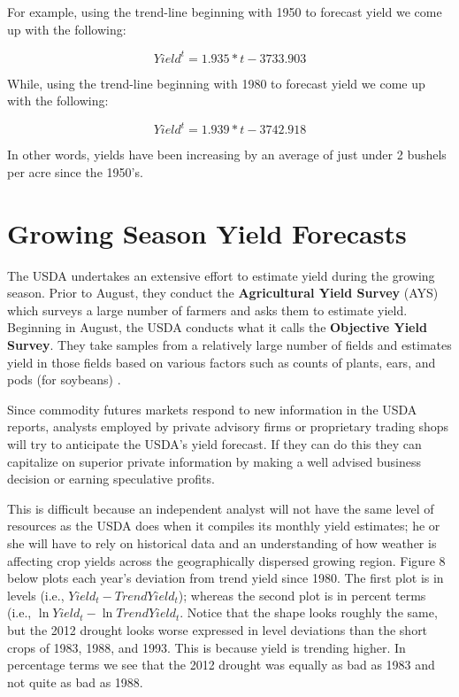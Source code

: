 \documentclass[
]{book}
\begin{document}
For example, using the trend-line beginning with 1950 to forecast yield we come up with the following:

\[Yield^{t} = 1.935*t - 3733.903\]

While, using the trend-line beginning with 1980 to forecast yield we come up with the following:

\[Yield^{t} = 1.939*t-3742.918\]

In other words, yields have been increasing by an average of just under 2 bushels per acre since the 1950's.

\hypertarget{growing-season-yield-forecasts}{%
\section{Growing Season Yield Forecasts}\label{growing-season-yield-forecasts}}

The USDA undertakes an extensive effort to estimate yield during the growing season. Prior to August, they conduct the \textbf{Agricultural Yield Survey} (AYS) which surveys a large number of farmers and asks them to estimate yield. Beginning in August, the USDA conducts what it calls the \textbf{Objective Yield Survey}. They take samples from a relatively large number of fields and estimates yield in those fields based on various factors such as counts of plants, ears, and pods (for soybeans) \citep{good_usda_2011}.

Since commodity futures markets respond to new information in the USDA reports, analysts employed by private advisory firms or proprietary trading shops will try to anticipate the USDA's yield forecast. If they can do this they can capitalize on superior private information by making a well advised business decision or earning speculative profits.

This is difficult because an independent analyst will not have the same level of resources as the USDA does when it compiles its monthly yield estimates; he or she will have to rely on historical data and an understanding of how weather is affecting crop yields across the geographically dispersed growing region. Figure 8 below plots each year's deviation from trend yield since 1980. The first plot is in levels (i.e., \(Yield_t - Trend Yield_t\)); whereas the second plot is in percent terms (i.e., \(\ln{Yield_t} - \ln{Trend Yield_t}\). Notice that the shape looks roughly the same, but the 2012 drought looks worse expressed in level deviations than the short crops of 1983, 1988, and 1993. This is because yield is trending higher. In percentage terms we see that the 2012 drought was equally as bad as 1983 and not quite as bad as 1988.
\end{document}
